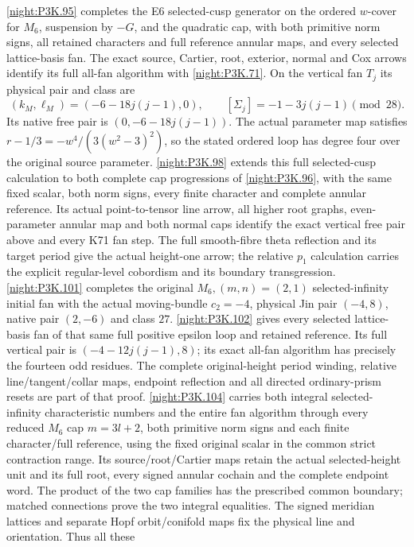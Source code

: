 \begin{theorem}
\cref{night:P3K.95} completes the E6 selected-cusp generator on the ordered
\(w\)-cover for \(M_6\), suspension by \(-G\), and the quadratic
cap, with both primitive norm signs, all retained characters and
full reference annular maps, and every selected lattice-basis fan.
The exact source, Cartier, root, exterior, normal and Cox arrows
identify its full all-fan algorithm with \cref{night:P3K.71}. On the vertical fan
\(T_j\) its physical pair and class are
\[
 (k_M,\ell_M)=(-6-18j(j-1),0),\qquad
 [\Sigma_j]=-1-3j(j-1)\pmod {28}.
\]
Its native free pair is \((0,-6-18j(j-1))\). The actual parameter
map satisfies \(r-1/3=-w^4/(3(w^2-3)^2)\), so the stated
ordered loop has degree four over the original source parameter.
\cref{night:P3K.98} extends this full selected-cusp calculation to both complete
cap progressions of \cref{night:P3K.96}, with the same fixed scalar, both norm signs,
every finite character and complete annular reference. Its actual
point-to-tensor line arrow, all higher root graphs, even-parameter
annular map and both normal caps identify the exact vertical free
pair above and every K71 fan step. The full smooth-fibre theta
reflection and its target period give the actual height-one arrow;
the relative \(p_1\) calculation carries the explicit regular-level
cobordism and its boundary transgression.
\cref{night:P3K.101} completes the original \(M_6,(m,n)=(2,1)\)
selected-infinity initial fan with the actual moving-bundle
\(c_2=-4\), physical Jin pair \((-4,8)\), native pair
\((2,-6)\) and class \(27\). \cref{night:P3K.102} gives every selected
lattice-basis fan of that same full positive epsilon loop and
retained reference. Its full vertical pair is
\((-4-12j(j-1),8)\); its exact all-fan algorithm has precisely
the fourteen odd residues. The complete original-height period
winding, relative line/tangent/collar maps, endpoint reflection
and all directed ordinary-prism resets are part of that proof.
\cref{night:P3K.104} carries both integral selected-infinity characteristic
numbers and the entire fan algorithm through every reduced
\(M_6\) cap \(m=3l+2\), both primitive norm signs and each
finite character/full reference, using the fixed original scalar
in the common strict contraction range. Its source/root/Cartier
maps retain the actual selected-height unit and its full root,
every signed annular cochain and the complete endpoint word.
The product of the two cap families has the prescribed common
boundary; matched connections prove the two integral equalities.
The signed meridian lattices and separate Hopf orbit/conifold
maps fix the physical line and orientation. Thus all these

\end{theorem}
